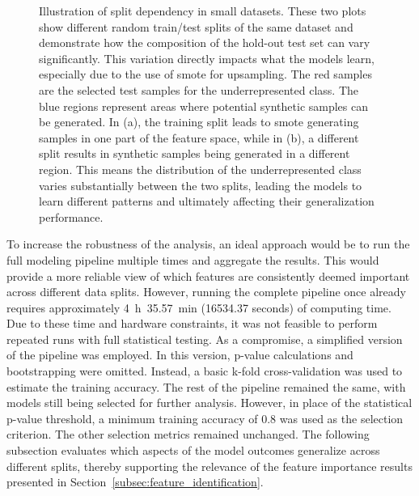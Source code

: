 \documentclass[12pt,a4paper]{report}
\begin{document}
\begin{figure}[h!]
    \caption[Illustration of Split Dependency]{Illustration of split dependency in small datasets. These two plots show different random train/test splits of the same dataset and demonstrate how the composition of the hold-out test set can vary significantly. This variation directly impacts what the models learn, especially due to the use of \gls{smote} for upsampling. The red samples are the selected test samples for the underrepresented class. The blue regions represent areas where potential synthetic samples can be generated. In (a), the training split leads to \gls{smote} generating samples in one part of the feature space, while in (b), a different split results in synthetic samples being generated in a different region. This means the distribution of the underrepresented class varies substantially between the two splits, leading the models to learn different patterns and ultimately affecting their generalization performance.}
    \label{fig:train_test_split_problem}
\end{figure}

\noindent
To increase the robustness of the analysis, an ideal approach would be to run the full modeling pipeline multiple times and aggregate the results. This would provide a more reliable view of which features are consistently deemed important across different data splits. However, running the complete pipeline once already requires approximately 4~h~35.57~min (16534.37 seconds) of computing time. Due to these time and hardware constraints, it was not feasible to perform repeated runs with full statistical testing. As a compromise, a simplified version of the pipeline was employed. In this version, p-value calculations and bootstrapping were omitted. Instead, a basic k-fold cross-validation was used to estimate the training accuracy. The rest of the pipeline remained the same, with models still being selected for further analysis. However, in place of the statistical p-value threshold, a minimum training accuracy of 0.8 was used as the selection criterion. The other selection metrics remained unchanged. The following subsection evaluates which aspects of the model outcomes generalize across different splits, thereby supporting the relevance of the feature importance results presented in Section~\ref{subsec:feature_identification}.
\end{document}
